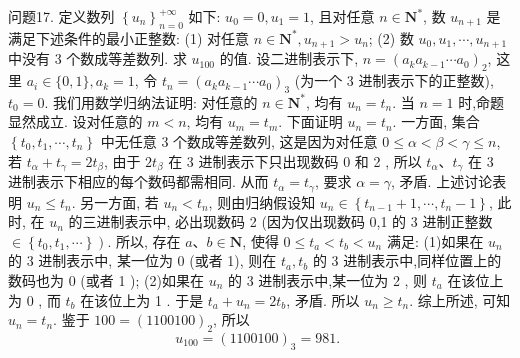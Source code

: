 问题17. 定义数列 $\left\{u_n\right\}_{n=0}^{+\infty}$ 如下: $u_0=0, u_1=1$, 且对任意 $n \in \mathbf{N}^*$, 数 $u_{n+1}$ 是满足下述条件的最小正整数:
(1) 对任意 $n \in \mathbf{N}^*, u_{n+1}>u_n$;
(2) 数 $u_0, u_1, \cdots, u_{n+1}$ 中没有 3 个数成等差数列.
求 $u_{100}$ 的值.
设二进制表示下, $n=\left(a_k a_{k-1} \cdots a_0\right)_2$, 这里 $a_i \in\{0,1\}, a_k=1$, 令 $t_n=\left(a_k a_{k-1} \cdots a_0\right)_3$ (为一个 3 进制表示下的正整数), $t_0=0$.
我们用数学归纳法证明: 对任意的 $n \in \mathbf{N}^*$, 均有 $u_n=t_n$.
当 $n=1$ 时,命题显然成立.
设对任意的 $m<n$, 均有 $u_m=t_m$. 下面证明 $u_n=t_n$.
一方面, 集合 $\left\{t_0, t_1, \cdots, t_n\right\}$ 中无任意 3 个数成等差数列, 这是因为对任意 $0 \leqslant \alpha<\beta<\gamma \leqslant n$, 若 $t_\alpha+t_\gamma=2 t_\beta$, 由于 $2 t_\beta$ 在 3 进制表示下只出现数码 0 和 2 , 所以 $t_\alpha 、 t_\gamma$ 在 3 进制表示下相应的每个数码都需相同.
从而 $t_\alpha=t_\gamma$, 要求 $\alpha=\gamma$, 矛盾.
上述讨论表明 $u_n \leqslant t_n$.
另一方面, 若 $u_n<t_n$, 则由归纳假设知 $u_n \in\left\{t_{n-1}+1, \cdots, t_n-1\right\}$, 此时, 在 $u_n$ 的三进制表示中, 必出现数码 2 (因为仅出现数码 0,1 的 3 进制正整数 $\in \left.\left\{t_0, t_1, \cdots\right\}\right)$. 所以, 存在 $a 、 b \in \mathbf{N}$, 使得 $0 \leqslant t_a<t_b<u_n$ 满足:
(1)如果在 $u_n$ 的 3 进制表示中, 某一位为 0 (或者 1), 则在 $t_a, t_b$ 的 3 进制表示中,同样位置上的数码也为 0 (或者 1 );
(2)如果在 $u_n$ 的 3 进制表示中,某一位为 2 , 则 $t_a$ 在该位上为 0 , 而 $t_b$ 在该位上为 1 .
于是 $t_a+u_n=2 t_b$, 矛盾.
所以 $u_n \geqslant t_n$.
综上所述, 可知 $u_n=t_n$. 鉴于 $100=(1100100)_2$, 所以
$$
u_{100}=(1100100)_3=981 \text {. }
$$



